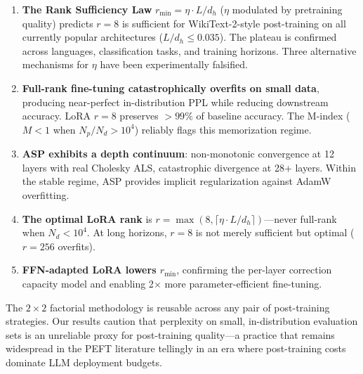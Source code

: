 \documentclass[11pt]{article}
\begin{document}
\begin{enumerate}[leftmargin=*]
\item \textbf{The Rank Sufficiency Law} $r_{\min} = \eta \cdot L/d_h$ ($\eta$ modulated by pretraining quality) predicts $r=8$ is sufficient for WikiText-2-style post-training on all currently popular architectures ($L/d_h \leq 0.035$). The plateau is confirmed across languages, classification tasks, and training horizons. Three alternative mechanisms for $\eta$ have been experimentally falsified.

\item \textbf{Full-rank fine-tuning catastrophically overfits on small data}, producing near-perfect in-distribution PPL while reducing downstream accuracy. LoRA $r=8$ preserves $>99\%$ of baseline accuracy. The M-index ($M < 1$ when $N_p/N_d > 10^4$) reliably flags this memorization regime.

\item \textbf{ASP exhibits a depth continuum}: non-monotonic convergence at 12 layers with real Cholesky ALS, catastrophic divergence at 28+ layers. Within the stable regime, ASP provides implicit regularization against AdamW overfitting.

\item \textbf{The optimal LoRA rank} is $r = \max(8, \lceil \eta \cdot L/d_h \rceil)$---never full-rank when $N_d < 10^4$. At long horizons, $r=8$ is not merely sufficient but optimal ($r=256$ overfits).

\item \textbf{FFN-adapted LoRA lowers $r_{\min}$}, confirming the per-layer correction capacity model and enabling 2$\times$ more parameter-efficient fine-tuning.
\end{enumerate}

The $2\times2$ factorial methodology is reusable across any pair of post-training strategies. Our results caution that perplexity on small, in-distribution evaluation sets is an unreliable proxy for post-training quality---a practice that remains widespread in the PEFT literature tellingly in an era where post-training costs dominate LLM deployment budgets.
\end{document}
